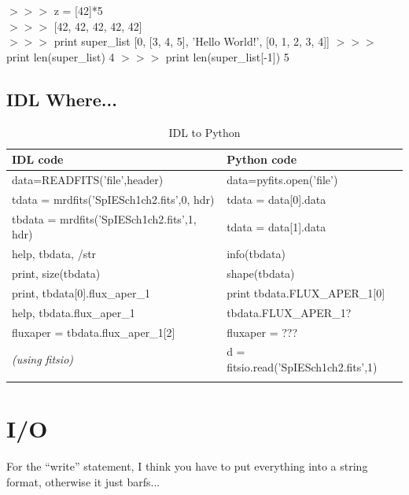 \documentclass[11pt,a4paper]{article}
\begin{document}
$>>>$ z =  [42]*5\\
$>>>$ [42, 42, 42, 42, 42]\\

$>>>$ print super\_list
[0, [3, 4, 5], 'Hello World!', [0, 1, 2, 3, 4]]
$>>>$ print len(super\_list)
4
$>>>$ print len(super\_list[-1])
5


\subsection{IDL Where...}






\begin{table}
  \begin{center}
    \setlength{\tabcolsep}{4pt}
    \begin{tabular}{ll}
      \hline\hline
      IDL code   & Python code \\
      \hline
      data=READFITS('file',header) 	 & data=pyfits.open('file')\\
      tdata  = mrdfits('SpIESch1ch2.fits',0, hdr) 	 & tdata = data[0].data \\
      tbdata = mrdfits('SpIESch1ch2.fits',1, hdr) 	 & tdata = data[1].data \\
      help, tbdata, /str     & info(tbdata)\\
      print, size(tbdata)  & shape(tbdata)\\
      print, tbdata[0].flux\_aper\_1 & print tbdata.FLUX\_APER\_1[0]\\
      help, tbdata.flux\_aper\_1        & tbdata.FLUX\_APER\_1? \\
      fluxaper = tbdata.flux\_aper\_1[2] & fluxaper = ??? \\
      \hline 
     {\it (using fitsio)} & d = fitsio.read('SpIESch1ch2.fits',1) \\
      \hline
      \label{tab:IDL2Python}
    \end{tabular}
    \caption{IDL to Python}
  \end{center}
\end{table}

\section{I/O}
For the ``write'' statement, I think you have to put everything into 
a string format, otherwise it just barfs... \\
\end{document}
